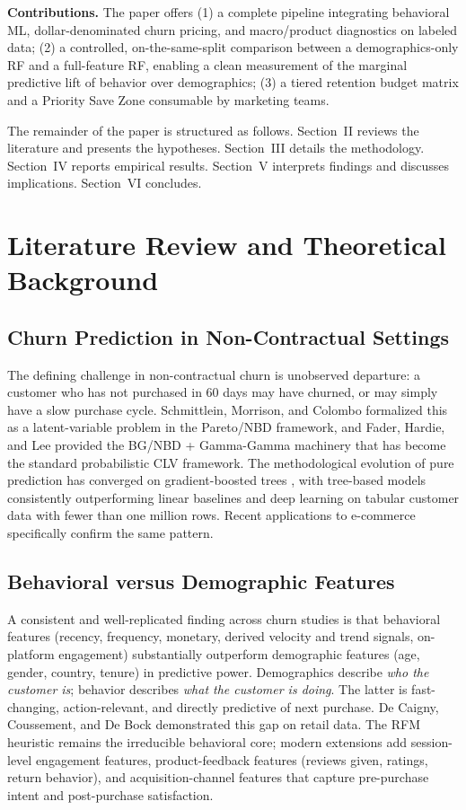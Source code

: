 \documentclass[conference]{IEEEtran}
\begin{document}
\textbf{Contributions.} The paper offers (1) a complete pipeline integrating behavioral ML, dollar-denominated churn pricing, and macro/product diagnostics on labeled data; (2) a controlled, on-the-same-split comparison between a demographics-only RF and a full-feature RF, enabling a clean measurement of the marginal predictive lift of behavior over demographics; (3) a tiered retention budget matrix and a Priority Save Zone consumable by marketing teams.

The remainder of the paper is structured as follows. Section~II reviews the literature and presents the hypotheses. Section~III details the methodology. Section~IV reports empirical results. Section~V interprets findings and discusses implications. Section~VI concludes.

\section{Literature Review and Theoretical Background}

\subsection{Churn Prediction in Non-Contractual Settings}

The defining challenge in non-contractual churn is unobserved departure: a customer who has not purchased in 60 days may have churned, or may simply have a slow purchase cycle. Schmittlein, Morrison, and Colombo \cite{schmittlein1987} formalized this as a latent-variable problem in the Pareto/NBD framework, and Fader, Hardie, and Lee \cite{fader2005a,fader2005b} provided the BG/NBD + Gamma-Gamma machinery that has become the standard probabilistic CLV framework. The methodological evolution of pure prediction has converged on gradient-boosted trees \cite{ahmad2019,grinsztajn2022}, with tree-based models consistently outperforming linear baselines and deep learning on tabular customer data with fewer than one million rows. Recent applications to e-commerce specifically \cite{vafeiadis2015,xie2020} confirm the same pattern.

\subsection{Behavioral versus Demographic Features}

A consistent and well-replicated finding across churn studies is that behavioral features (recency, frequency, monetary, derived velocity and trend signals, on-platform engagement) substantially outperform demographic features (age, gender, country, tenure) in predictive power. Demographics describe \emph{who the customer is}; behavior describes \emph{what the customer is doing}. The latter is fast-changing, action-relevant, and directly predictive of next purchase. De Caigny, Coussement, and De Bock \cite{decaigny2018} demonstrated this gap on retail data. The RFM heuristic \cite{hughes1994,bult1995} remains the irreducible behavioral core; modern extensions add session-level engagement features, product-feedback features (reviews given, ratings, return behavior), and acquisition-channel features that capture pre-purchase intent and post-purchase satisfaction.
\end{document}
